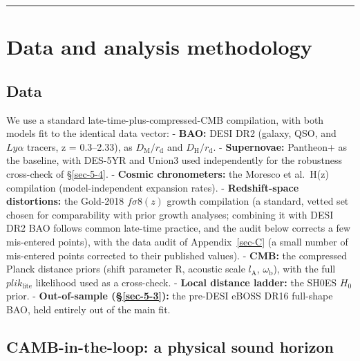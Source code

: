 \documentclass[preprint,12pt]{elsarticle}
\begin{document}
\begin{center}\rule{0.5\linewidth}{0.5pt}\end{center}

\section{Data and analysis methodology}\label{sec-4}

\subsection{Data}\label{sec-4-1}

We use a standard late-time-plus-compressed-CMB compilation, with both
models fit to the identical data vector: - \textbf{BAO:} DESI DR2
(galaxy, QSO, and \(Ly\alpha\) tracers, z = 0.3--2.33), as
\(D_{\mathrm{M}}/r_{\mathrm{d}}\) and \(D_{\mathrm{H}}/r_{\mathrm{d}}\).
- \textbf{Supernovae:} Pantheon+ as the baseline, with DES-5YR and
Union3 used independently for the robustness cross-check of
§\ref{sec-5-4}. - \textbf{Cosmic chronometers:} the Moresco et al.~H(z)
compilation (model-independent expansion rates). -
\textbf{Redshift-space distortions:} the Gold-2018
\citep{Sagredo:2018ahx} \(f\sigma 8(z)\) growth compilation (a standard,
vetted set chosen for comparability with prior growth analyses;
combining it with DESI DR2 BAO follows common late-time practice, and
the audit below corrects a few mis-entered points), with the data audit
of Appendix~\ref{sec-C} (a small number of mis-entered points corrected
to their published values). - \textbf{CMB:} the compressed Planck
distance priors (shift parameter R, acoustic scale \(l_{\mathrm{A}}\),
\(\omega _{\mathrm{b}}\)), with the full \(plik_{\mathrm{lite}}\)
likelihood used as a cross-check. - \textbf{Local distance ladder:} the
SH0ES \(H_{0}\) prior. - \textbf{Out-of-sample (§\ref{sec-5-3}):} the
pre-DESI eBOSS DR16 full-shape BAO, held entirely out of the main fit.

\subsection{CAMB-in-the-loop: a physical sound horizon}\label{sec-4-2}
\end{document}
